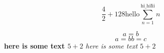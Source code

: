       \begin{equation} \frac{4}{2} + 128 \text{hello} \sum_{n=1}^{\text{hi\_hi\^hi}} n \end{equation}

\begin{equation} 
  a = b %
\end{equation}
\begin{equation} 
  a = b %
  b = c
\end{equation}
\textbf{
here is some text $5 + 2$ %
}
\textit{
here is some text $5 + 2$ %
}
